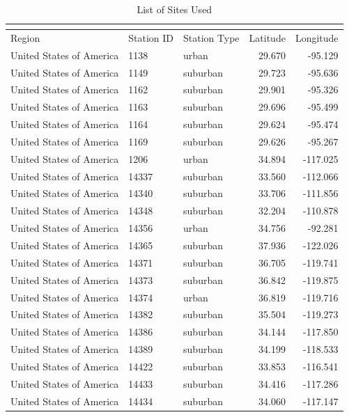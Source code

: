 \documentclass{article}
\begin{document}
\begingroup
\fontsize{12.0pt}{14.4pt}\selectfont
\begin{longtable}{lllrr}
\caption{List of Sites Used} \\
\label{si_tab:site_list} \\
\toprule
Region & Station ID & Station Type & Latitude & Longitude \\ 
\midrule\addlinespace[2.5pt]
United States of America & 1138 & urban & 29.670 & -95.129 \\ 
United States of America & 1149 & suburban & 29.723 & -95.636 \\ 
United States of America & 1162 & suburban & 29.901 & -95.326 \\ 
United States of America & 1163 & suburban & 29.696 & -95.499 \\ 
United States of America & 1164 & suburban & 29.624 & -95.474 \\ 
United States of America & 1169 & suburban & 29.626 & -95.267 \\ 
United States of America & 1206 & urban & 34.894 & -117.025 \\ 
United States of America & 14337 & suburban & 33.560 & -112.066 \\ 
United States of America & 14340 & suburban & 33.706 & -111.856 \\ 
United States of America & 14348 & suburban & 32.204 & -110.878 \\ 
United States of America & 14356 & urban & 34.756 & -92.281 \\ 
United States of America & 14365 & suburban & 37.936 & -122.026 \\ 
United States of America & 14371 & suburban & 36.705 & -119.741 \\ 
United States of America & 14373 & suburban & 36.842 & -119.875 \\ 
United States of America & 14374 & urban & 36.819 & -119.716 \\ 
United States of America & 14382 & suburban & 35.504 & -119.273 \\ 
United States of America & 14386 & suburban & 34.144 & -117.850 \\ 
United States of America & 14389 & suburban & 34.199 & -118.533 \\ 
United States of America & 14422 & suburban & 33.853 & -116.541 \\ 
United States of America & 14433 & suburban & 34.416 & -117.286 \\ 
United States of America & 14434 & suburban & 34.060 & -117.147 \\ 

\end{longtable}
\end{document}

